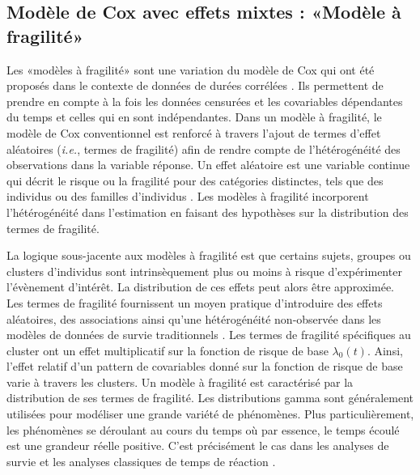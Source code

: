 \subsection{Modèle de Cox avec effets mixtes : «Modèle à fragilité»}
\label{modeledefragilite}

Les «modèles à fragilité» sont une variation du modèle de Cox qui ont été proposés dans le contexte de données de durées corrélées \citep{hougaard1995frailty, rondeau2003maximum, therneau2003penalized, wienke2003frailty}. 
Ils permettent de prendre en compte à la fois les données censurées et les covariables dépendantes du temps et celles qui en sont indépendantes. 
Dans un modèle à fragilité, le modèle de Cox conventionnel est renforcé à travers l'ajout de termes d'effet aléatoires (\textit{i.e.}, termes de fragilité) afin de rendre compte de l'hétérogénéité des observations dans la variable réponse. 
Un effet aléatoire est une variable continue qui décrit le risque ou la fragilité pour des catégories distinctes, tels que des individus ou des familles d'individus \citep{therneau2003penalized}. 
Les modèles à fragilité incorporent l'hétérogénéité dans l'estimation en faisant des hypothèses sur la distribution des termes de fragilité. 

La logique sous-jacente aux modèles à fragilité est que certains sujets, groupes ou clusters d'individus sont intrinsèquement plus ou moins à risque d'expérimenter l'évènement d'intérêt. 
La distribution de ces effets peut alors être approximée. 
Les termes de fragilité fournissent un moyen pratique d’introduire des effets aléatoires, des associations ainsi qu'une hétérogénéité non-observée dans les modèles de données de survie traditionnels \citep{wienke2003frailty}. 
Les termes de fragilité spécifiques au cluster ont un effet multiplicatif sur la fonction de risque de base $\lambda_0(t)$. 
Ainsi, l'effet relatif d'un pattern de covariables donné sur la fonction de risque de base varie à travers les clusters. 
Un modèle à fragilité est caractérisé par la distribution de ses termes de fragilité. 
Les distributions gamma sont généralement utilisées pour modéliser une grande variété de phénomènes. 
Plus particulièrement, les phénomènes se déroulant au cours du temps où par essence, le temps écoulé est une grandeur réelle positive. 
C'est précisément le cas dans les analyses de survie et les analyses classiques de temps de réaction \citep{letue2018statistical}. 

